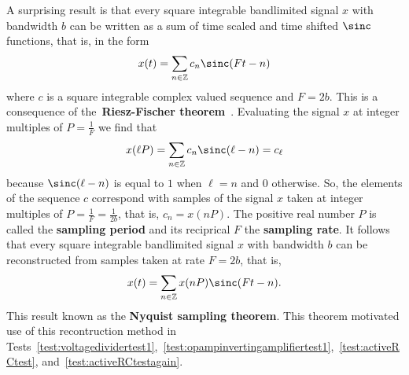 \documentclass[11pt,a4paper]{book}
\theoremstyle{plain}
\numberwithin{equation}{section}
\newcommand{\ints}{{\mathbb Z}}
\newcommand{\term}{\textbf}
\newcounter{test}
\begin{document}
A surprising result is that every square integrable bandlimited signal $x$ with bandwidth $b$ can be written as a sum of time scaled and time shifted $\sinc$ functions, that is, in the form
\begin{equation}\label{eq:sincinterformula}
x(t) = \sum_{n \in \ints} c_n \sinc(F t - n)
\end{equation}
where $c$ is a square integrable complex valued sequence and $F = 2b$.  This is a consequence of the~\term{Riesz-Fischer theorem}~\cite[page~91]{Rudin_real_and_complex_analysis}.  Evaluating the signal $x$ at integer multiples of $P = \tfrac{1}{F}$ we find that
\[
x(\ell P) = \sum_{n \in \ints} c_n \sinc( \ell - n ) = c_\ell
\]
because $\sinc( \ell - n)$ is equal to $1$ when $\ell = n$ and $0$ otherwise.  So, the elements of the sequence $c$ correspond with samples of the signal $x$ taken at integer multiples of $P = \tfrac{1}{F} = \tfrac{1}{2b}$, that is, $c_n = x(nP)$.  The positive real number $P$ is called the \term{sampling period} and its reciprical $F$ the \term{sampling rate}.  It follows that every square integrable bandlimited signal $x$ with bandwidth $b$ can be reconstructed from samples taken at rate $F = 2b$, that is,
\[
x(t) = \sum_{n \in \ints} x( n P ) \sinc(F t - n).
\]
This result known as the \term{Nyquist sampling theorem}.  %
This theorem motivated use of this recontruction method in Tests~\ref{test:voltagedividertest1},~\ref{test:opampinvertingamplifiertest1},~\ref{test:activeRCtest}, and~\ref{test:activeRCtestagain}.
\end{document}
